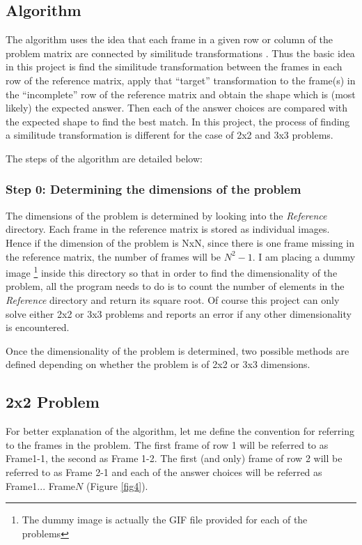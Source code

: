 \documentclass[10pt, letter]{article}
\begin{document}
\subsection*{Algorithm}
The algorithm uses the idea that each frame in a given row or column of the problem matrix are connected by similitude transformations \cite{paper}. Thus the basic idea in this project is find the similitude transformation between the frames in each row of the reference matrix, apply that ``target'' transformation to the frame(s) in the ``incomplete'' row of the reference matrix and obtain the shape which is (most likely) the expected answer. Then each of the answer choices are compared with the expected shape to find the best match. In this project, the process of finding a similitude transformation is different for the case of 2x2 and 3x3 problems.

The steps of the algorithm are detailed below:

\subsubsection*{Step 0: Determining the dimensions of the problem}
The dimensions of the problem is determined by looking into the \textit{Reference} directory. Each frame in the reference matrix is stored as individual images. Hence if the dimension of the problem is NxN, since there is one frame missing in the reference matrix, the number of frames will be $N^2 - 1$. I am placing a dummy image \footnote{The dummy image is actually the GIF file provided for each of the problems} inside this directory so that in order to find the dimensionality of the problem, all the program needs to do is to count the number of elements in the \textit{Reference} directory and return its square root. Of course this project can only solve either 2x2 or 3x3 problems and reports an error if any other dimensionality is encountered.

Once the dimensionality of the problem is determined, two possible methods are defined depending on whether the problem is of 2x2 or 3x3 dimensions.

\subsection*{2x2 Problem}
For better explanation of the algorithm, let me define the convention for referring to the frames in the problem. The first frame of row 1 will be referred to as Frame1-1, the second as Frame 1-2. The first (and only) frame of row 2 will be referred to as Frame 2-1 and each of the answer choices will be referred as Frame1... Frame$N$ (Figure \ref{fig4}).
\end{document}
